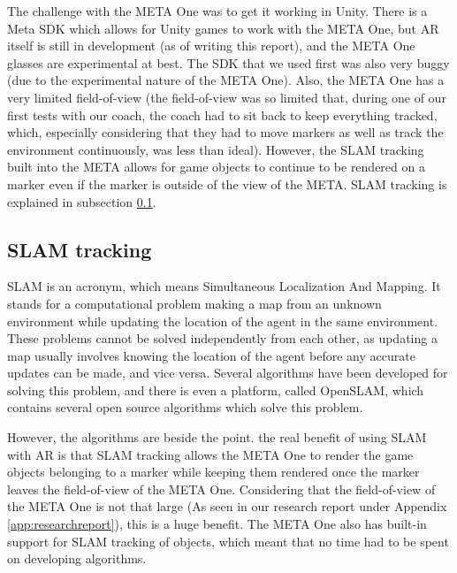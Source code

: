         The challenge with the META One was to get it working in Unity.
        There is a Meta SDK which allows for Unity games to work with
        the META One, but AR itself is still in development (as of
        writing this report), and the META One glasses are experimental
        at best. The SDK that we used first was also very buggy (due to the
        experimental nature of the META One). Also, the META One has a very
        limited field-of-view (the field-of-view was so limited that, during
        one of our first tests with our coach, the coach had to sit back
        to keep everything tracked, which, especially considering that they
        had to move markers as well as track the environment continuously,
        was less than ideal). However, the SLAM tracking built into the
        META allows for game objects to continue to be rendered on a marker
        even if the marker is outside of the view of the META. SLAM tracking
        is explained in subsection \ref{ssec:slamloc}.
        
        \subsection{SLAM tracking} \label{ssec:slamloc}
            SLAM is an acronym, which means Simultaneous Localization And
            Mapping. It stands for a computational problem making a map
            from an unknown environment while updating the location of the
            agent in the same environment. These problems cannot be solved
            independently from each other, as updating a map usually involves
            knowing the location of the agent before any accurate updates
            can be made, and vice versa. Several algorithms have been developed
            for solving this problem, and there is even a platform, called OpenSLAM,
            which contains several open source algorithms which solve this
            problem.
            
            However, the algorithms are beside the point. the real benefit of 
            using SLAM with AR is that SLAM tracking allows the META One to
            render the game objects belonging to a marker while keeping them
            rendered once the marker leaves the field-of-view of the META One.
            Considering that the field-of-view of the META One is not that large
            (As seen in our research report under Appendix \ref{app:researchreport}),
            this is a huge benefit. The META One also has built-in support for
            SLAM tracking of objects, which meant that no time had to be spent
            on developing algorithms.


